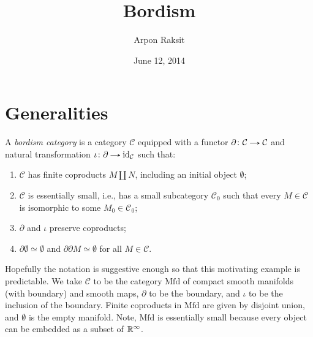 



\title{Bordism}
\author{Arpon Raksit}
\date{June 12, 2014}


\maketitle
\thispagestyle{fancy}


\renewcommand{\d}{\partial}
\newcommand{\e}{\emptyset}
\newcommand{\Mfd}{\mathrm{Mfd}}
\renewcommand{\C}{\mathcal{C}}


\section{Generalities}

\begin{definition}
  A \emph{bordism category} is a category $\C$ equipped with a functor
  $\d \c \C \to \C$ and natural transformation $\iota \c \d \to
  \id_\C$ such that:
  \begin{enumerate}
  \item $\C$ has finite coproducts $M \amalg N$, including an initial
    object $\e$;
  \item $\C$ is essentially small, i.e., has a small subcategory
    $\C_0$ such that every $M \in \C$ is isomorphic to some $M_0 \in
    \C_0$;
  \item $\d$ and $\iota$ preserve coproducts;
  \item $\d\e \simeq \e$ and $\d\d M \simeq \e$ for all $M \in \C$.
  \end{enumerate}
\end{definition}

\begin{example} \label{main-example}
  Hopefully the notation is suggestive enough so that this motivating
  example is predictable. We take $\C$ to be the category $\Mfd$ of
  compact smooth manifolds (with boundary) and smooth maps, $\d$ to be
  the boundary, and $\iota$ to be the inclusion of the
  boundary. Finite coproducts in $\Mfd$ are given by disjoint union,
  and $\e$ is the empty manifold. Note, $\Mfd$ is essentially small
  because every object can be embedded as a subset of $\mathbb{R}^\infty$.
\end{example}

